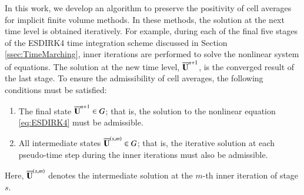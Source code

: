 In this work, we develop an algorithm to preserve the positivity of cell averages for implicit finite volume methods. In these methods, the solution at the next time level is obtained iteratively. For example, during each of the final five stages of the ESDIRK4 time integration scheme discussed in Section \ref{ssec:TimeMarching}, inner iterations are performed to solve the nonlinear system of equations. The solution at the new time level, $\overline{\mathbf{U}}^{n+1}$, is the converged result of the last stage.
To ensure the admissibility of cell averages, the following conditions must be satisfied:
\begin{enumerate}[label=(\alph*)]
\item The final state $\overline{\mathbf{U}}^{n+1} \in G$; that is, the solution to the nonlinear equation \eqref{eq:ESDIRK4} must be admissible.
\item All intermediate states $\overline{\mathbf{U}}^{(s,m)} \in G$; that is, the iterative solution at each pseudo-time step during the inner iterations must also be admissible.
\end{enumerate}
Here, $\overline{\mathbf{U}}^{(s,m)}$ denotes the intermediate solution at the $m$-th inner iteration of stage $s$.

